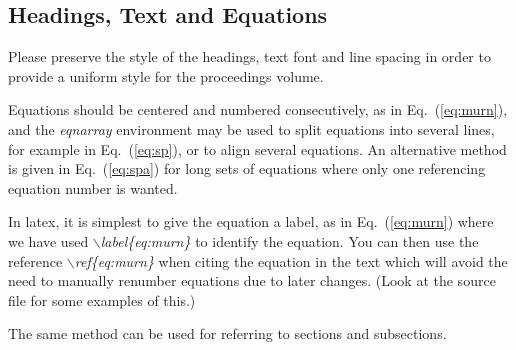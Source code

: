\documentclass{ws-procs9x6}
\begin{document}
\subsection{Headings, Text and Equations}
Please preserve the style of the headings, text font and line 
spacing in order to provide a uniform style for the 
proceedings volume. 

Equations should be centered and numbered consecutively, as in
Eq.~(\ref{eq:murn}), and the {\em eqnarray} environment may be
used to split equations into several lines, for example in
Eq.~(\ref{eq:sp}), or to align several equations.  An alternative
method is given in Eq.~(\ref{eq:spa}) for long sets of equations 
where only one referencing equation number is wanted.

In latex, it is simplest to give the equation a label, as in
Eq.~(\ref{eq:murn}) where we have used 
{\em $\backslash$label\{eq:murn\}} to identify the equation.
You can then use the reference {\em $\backslash$ref\{eq:murn\}}
when citing the equation in the text which will avoid 
the need to manually renumber equations due to later changes. (Look at
the source file for some examples of this.)

The same method can be used for referring to sections 
and subsections.
\end{document}
